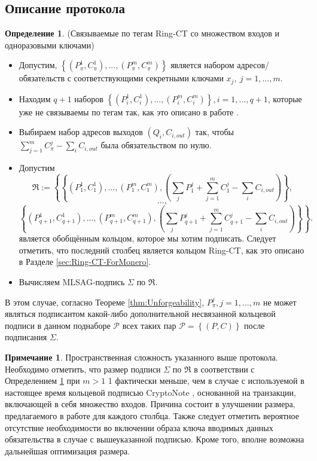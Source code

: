 \documentclass{mrl}
\theoremstyle{definition}
\numberwithin{thm}{section}
\newtheorem{rem}[thm]{Примечание}
\newtheorem{defn}[thm]{Определение}
\begin{document}
\subsection{Описание протокола}
\begin{defn}
\label{RCTProtocol}(Связываемые по тегам Ring-CT со множеством входов и одноразовыми ключами)
\end{defn}
\begin{itemize}
\item Допустим, $\left\{ \left(P_{\pi}^{1},C_{\pi}^{1}\right),...,\left(P_{\pi}^{m},C_{\pi}^{m}\right)\right\} $
является набором адресов/обязательств с соответствующими секретными ключами $x_{j},\ j=1,...,m$.
\item Находим $q+1$ наборов $\left\{ \left(P_{i}^{1},C_{i}^{1}\right),...,\left(P_{i}^{m},C_{i}^{m}\right)\right\} ,i=1,...,q+1$, которые уже не связываемы по тегам так, как это описано в работе \cite[стр. 6]{FS}.
\item Выбираем набор адресов выходов $\left(Q_{i},C_{i,out}\right)$ так, чтобы $\sum_{j=1}^{m}C_{\pi}^{j}-\sum_{i}C_{i,out}$ была обязательством по нулю.
\item Допустим
\[
\mathfrak{R}:=\left\{ \left\{ \left(P_{1}^{1},C_{1}^{1}\right),...,\left(P_{1}^{m},C_{1}^{m}\right),\left(\sum_{j}P_{1}^{j}+\sum_{j=1}^{m}C_{1}^{j}-\sum_{i}C_{i,out}\right)\right\} ,\right.
\]
\[
...,
\]
\[
\left.\left\{ \left(P_{q+1}^{1},C_{q+1}^{1}\right),...,\left(P_{q+1}^{m},C_{q+1}^{m}\right),\left(\sum_{j}P_{q+1}^{j}+\sum_{j=1}^{m}C_{q+1}^{j}-\sum_{i}C_{i,out}\right)\right\} \right\} .
\]
является обобщённым кольцом, которое мы хотим подписать. Следует отметить, что последний столбец является кольцом Ring-CT, как это описано в Разделе \ref{sec:Ring-CT-ForMonero}.
\item Вычисляем MLSAG-подпись $\Sigma$ по $\mathfrak{R}.$
\end{itemize}
В этом случае, согласно Теореме \ref{thm:Unforgeability}, $P_{\pi}^{j},j=1,...,m$ не может являться подписантом какой-либо дополнительной несвязанной кольцевой подписи в данном поднаборе $\mathcal{P}$ всех таких пар $\mathcal{P}=\left\{ \left(P,C\right)\right\} $ после подписания $\Sigma$.
\begin{rem}
Пространственная сложность указанного выше протокола. Необходимо отметить, что размер подписи $\Sigma$ по $\mathfrak{R}$ в соответствии с Определением \ref{RCTProtocol} при $m>1$ 1 фактически меньше, чем в случае с используемой в настоящее время кольцевой подписью CryptoNote \cite{CN}, основанной на транзакции, включающей в себя множество входов. Причина состоит в улучшении размера, предлагаемого в работе \cite{LWW} для каждого столбца. Также следует отметить вероятное отсутствие необходимости во включении образа ключа вводимых данных обязательства в случае с вышеуказанной подписью. Кроме того, вполне возможна дальнейшая оптимизация размера.\end{rem}
\end{document}
